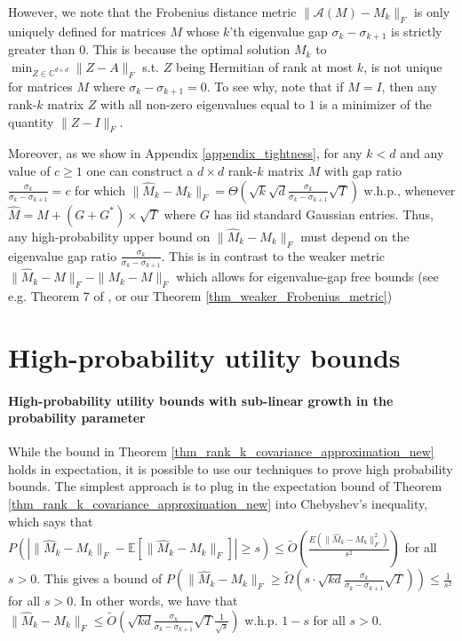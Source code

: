 \documentclass[11pt,letterpaper]{article}
\begin{document}
However, we note that the Frobenius distance metric $\|\mathcal{A}(M) - M_k\|_F$ is only uniquely defined for matrices $M$ whose $k$’th eigenvalue gap $\sigma_k - \sigma_{k+1}$ is strictly greater than $0$.
%
This is because the optimal solution $M_k$ to  $\min_{Z \in \mathbb{C}^{d \times d}} \|  Z - A\|_F$ s.t. $Z$ being Hermitian of rank at most $k$, is not unique for matrices $M$ where $\sigma_k - \sigma_{k+1} = 0$.
%
 To see why, note that if $M=I$, then any rank-$k$ matrix $Z$ with all non-zero eigenvalues equal to $1$ is a minimizer of the quantity $\| Z - I\|_F$.

 Moreover, as we show in Appendix \ref{appendix_tightness},  for any $k<d$ and any value of $c \geq 1$ one can construct a $d \times d$ rank-$k$ matrix $M$ with gap ratio $\frac{\sigma_k}{\sigma_k- \sigma_{k+1}} = c$ for which $\|\hat{M}_k - M_k\|_F = \Theta(\sqrt{k} \sqrt{d} \frac{\sigma_k}{\sigma_k- \sigma_{k+1}} \sqrt{T})$ w.h.p., whenever $\hat{M} = M + (G + G^\ast) \times \sqrt{T}$ where $G$ has iid standard Gaussian entries.
%
Thus, any high-probability upper bound on $\|\hat{M}_k - M_k\|_F$ must depend on the eigenvalue gap ratio $\frac{\sigma_k}{\sigma_k- \sigma_{k+1}}$.
%
This is in contrast to the weaker metric $\|\hat{M}_k - M\|_F - \|M_k - M\|_F$ which allows for eigenvalue-gap free bounds (see e.g. Theorem 7 of \cite{dwork2014analyze}, or our Theorem \ref{thm_weaker_Frobenius_metric})



\section{High-probability utility bounds}\label{sec_high_probability}



\paragraph{High-probability utility bounds with sub-linear growth in the probability parameter}
%
While the bound in Theorem \ref{thm_rank_k_covariance_approximation_new} holds in expectation, 
it is possible to use our techniques to prove high probability bounds. 
%
The simplest approach is to plug in the expectation bound of Theorem \ref{thm_rank_k_covariance_approximation_new} into Chebyshev's inequality, which says that $P(|\| \hat{M}_k - M_k \|_F - \mathbb{E}[\| \hat{M}_k - M_k \|_F ]|\geq s) \leq \tilde{O}\left(\frac{E(\| \hat{M}_k - M_k \|_F^2)}{s^2} \right )$ for all $s>0$.
%
 This gives a bound of $P(\|\hat{M}_k - M_k \|_F \geq \tilde{\Omega}(s \cdot \sqrt{kd} \frac{\sigma_k}{\sigma_k - \sigma_{k+1}}  \sqrt{T})) \leq \frac{1}{s^2}$ for all $s>0$.
  In other words, we have that $\|\hat{M}_k - M_k \|_F \leq \tilde{O}\left(\sqrt{kd} \frac{\sigma_k}{\sigma_k - \sigma_{k+1}}  \sqrt{T}  \frac{1}{\sqrt{s}}\right )$ w.h.p. $1-s$ for all $s>0$.
\end{document}
